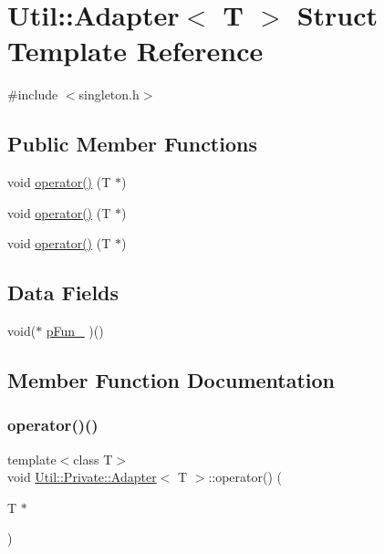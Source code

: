 \hypertarget{structUtil_1_1Private_1_1Adapter}{}\section{Util\+:\+:Adapter$<$ T $>$ Struct Template Reference}
\label{structUtil_1_1Private_1_1Adapter}


{\ttfamily \#include $<$singleton.\+h$>$}

\subsection*{Public Member Functions}
\begin{DoxyCompactItemize}
\item 
void \mbox{\hyperlink{structUtil_1_1Private_1_1Adapter_af610b105c762e6f42233bf8739b4fd87}{operator()}} (T $\ast$)
\item 
void \mbox{\hyperlink{structUtil_1_1Private_1_1Adapter_af610b105c762e6f42233bf8739b4fd87}{operator()}} (T $\ast$)
\item 
void \mbox{\hyperlink{structUtil_1_1Private_1_1Adapter_af610b105c762e6f42233bf8739b4fd87}{operator()}} (T $\ast$)
\end{DoxyCompactItemize}
\subsection*{Data Fields}
\begin{DoxyCompactItemize}
\item 
void($\ast$ \mbox{\hyperlink{structUtil_1_1Private_1_1Adapter_a06bc60369b635819913a35c3ee01e8d0}{p\+Fun\+\_\+}} )()
\end{DoxyCompactItemize}


\subsection{Member Function Documentation}
\mbox{\label{structUtil_1_1Private_1_1Adapter_af610b105c762e6f42233bf8739b4fd87}} 
\subsubsection{\texorpdfstring{operator()()}{operator()()}\hspace{0.1cm}{\footnotesize\ttfamily [1/3]}}
{\footnotesize\ttfamily template$<$class T$>$ \\
void \mbox{\hyperlink{structUtil_1_1Private_1_1Adapter}{Util\+::\+Private\+::\+Adapter}}$<$ T $>$\+::operator() (\begin{DoxyParamCaption}\item[{T $\ast$}]{ }\end{DoxyParamCaption})\hspace{0.3cm}{\ttfamily [inline]}}


